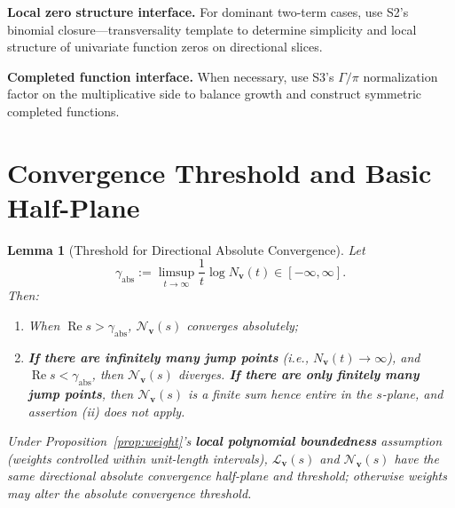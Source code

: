 \documentclass[11pt,a4paper]{article}
\newtheorem{lemma}[theorem]{Lemma}
\theoremstyle{remark}
\DeclareMathOperator{\Re}{Re}
\begin{document}
\textbf{Local zero structure interface.} For dominant two-term cases, use S2's binomial closure---transversality template to determine simplicity and local structure of univariate function zeros on directional slices.

\textbf{Completed function interface.} When necessary, use S3's $\Gamma/\pi$ normalization factor on the multiplicative side to balance growth and construct symmetric completed functions.

\section{Convergence Threshold and Basic Half-Plane}

\begin{lemma}[Threshold for Directional Absolute Convergence]\label{lem:threshold}
Let
\begin{equation}
\gamma_{\mathrm{abs}}:=\limsup_{t\to\infty}\frac{1}{t}\log N_{\mathbf{v}}(t)\in[-\infty,\infty] .
\end{equation}
Then:
\begin{enumerate}
\item[(i)] When $\Re s>\gamma_{\mathrm{abs}}$, $\mathscr{N}_{\mathbf{v}}(s)$ converges absolutely;
\item[(ii)] \textbf{If there are infinitely many jump points} (i.e., $N_{\mathbf{v}}(t)\to\infty$), and $\Re s<\gamma_{\mathrm{abs}}$, then $\mathscr{N}_{\mathbf{v}}(s)$ diverges. \textbf{If there are only finitely many jump points}, then $\mathscr{N}_{\mathbf{v}}(s)$ is a finite sum hence entire in the $s$-plane, and assertion (ii) does not apply.
\end{enumerate}
Under Proposition~\ref{prop:weight}'s \textbf{local polynomial boundedness} assumption (weights controlled within unit-length intervals), $\mathcal{L}_{\mathbf{v}}(s)$ and $\mathscr{N}_{\mathbf{v}}(s)$ have the same directional absolute convergence half-plane and threshold; otherwise weights may alter the absolute convergence threshold.
\end{lemma}
\end{document}
